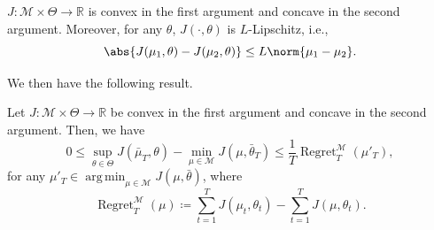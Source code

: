 \documentclass{article} %
\DeclareMathOperator*{\argmin}{arg\,min}
\DeclareMathOperator{\Regret}{Regret}
\begin{document}
\begin{tcolorbox}[ThmFrame]
    \begin{assmp} \label{assmp:saddle}
        $J : \mathcal{M} \times \Theta \to \mathbb{R}$ is convex in the first argument and concave in the second argument.
        Moreover, for any $\theta$, $J(\cdot, \theta)$ is $L$-Lipschitz, i.e.,
        \begin{equation}
            \abs{ J(\mu_1, \theta) - J(\mu_2, \theta) } \leq L \norm{\mu_1 - \mu_2}.
        \end{equation}
    \end{assmp}
\end{tcolorbox}

We then have the following result.

\begin{tcolorbox}[ThmFrame]
\begin{lemma} \label{thm:saddle_regret}
    Let $J : \mathcal{M} \times \Theta \to \mathbb{R}$ be convex in the first argument and concave in the second argument.
    Then, we have
    \begin{equation} \label{eq:saddle:thm}
        0 \leq \sup_{\theta \in \Theta} J(\bar{\mu}_T, \theta) - \min_{\mu \in \mathcal{M}} J(\mu, \bar{\theta}_T)
        \leq \frac{1}{T} \Regret_T^\mathcal{M}(\mu'_T),
    \end{equation}
    for any $\mu'_T \in \argmin_{\mu \in \mathcal{M}} J(\mu, \bar{\theta})$, where
    \begin{equation}
        \Regret_T^\mathcal{M}(\mu) \coloneqq \sum_{t=1}^T J(\mu_t, \theta_t) - \sum_{t=1}^T J(\mu, \theta_t).
    \end{equation}
\end{lemma}
\end{tcolorbox}
\end{document}
